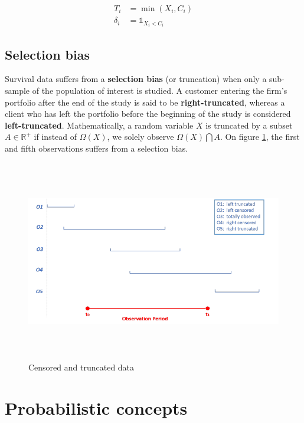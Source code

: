 \documentclass[
]{book}
\begin{document}
\begin{equation}
  \begin{aligned}
  T_i & = \min(X_i, C_i) \\
  \delta_i & = \mathbb{1}_{X_i < C_i}
  \end{aligned}
  \label{eq:censoring}
\end{equation}

\hypertarget{selection-bias}{%
\subsection{Selection bias}\label{selection-bias}}

Survival data suffers from a \textbf{selection bias} (or truncation) when only a sub-sample of the population of interest is studied. A customer entering the firm's portfolio after the end of the study is said to be \textbf{right-truncated}, whereas a client who has left the portfolio before the beginning of the study is considered \textbf{left-truncated}. Mathematically, a random variable \(X\) is truncated by a subset \(A \in \mathbb{R}^+\) if instead of \(\Omega(X)\), we solely observe \(\Omega(X)\bigcap A\). On figure \ref{fig:censoring}, the first and fifth observations suffers from a selection bias.

\begin{figure}

{\centering \includegraphics[width=500pt,height=250pt]{./imgs/censoring_and_truncation} 

}

\caption{Censored and truncated data}\label{fig:censoring}
\end{figure}

\hypertarget{probabilistic-concepts}{%
\section{Probabilistic concepts}\label{probabilistic-concepts}}
\end{document}
